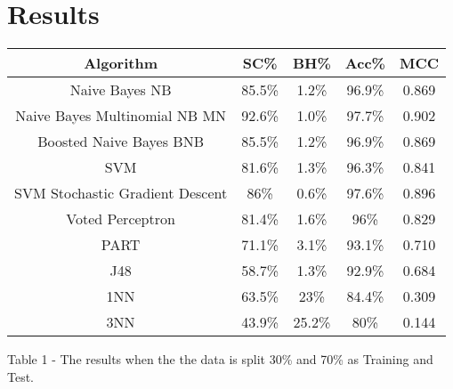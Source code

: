 \chapter{Results}
\label{chap:results}

\vspace{1cm}

\begin{center}
 \begin{tabular}{|c|c|c|c|c|} 
 \hline
 Algorithm & SC\% & BH\% & Acc\%  & MCC \\ [0.5ex] 
 \hline\hline
 Naive Bayes NB & 85.5\% & 1.2\% & 96.9\% & 0.869  \\ 
 \hline
 Naive Bayes Multinomial NB MN & 92.6\% & 1.0\% & 97.7\% & 0.902  \\ 
 \hline
 Boosted Naive Bayes BNB & 85.5\% & 1.2\% & 96.9\% & 0.869  \\ 
 \hline
 SVM & 81.6\% & 1.3\% & 96.3\% & 0.841  \\ 
 \hline
 SVM Stochastic Gradient Descent & 86\% & 0.6\% & 97.6\% & 0.896  \\ 
 \hline
 Voted Perceptron & 81.4\% & 1.6\% & 96\% & 0.829  \\ 
 \hline
 PART & 71.1\% & 3.1\% & 93.1\% & 0.710  \\ 
 \hline
 J48 & 58.7\% & 1.3\% & 92.9\% & 0.684  \\ 
 \hline
 1NN & 63.5\% & 23\% & 84.4\% & 0.309  \\ 
 \hline
 3NN & 43.9\% & 25.2\% & 80\% & 0.144 \\ [1ex] 
 \hline
 \end{tabular}
 
      \small
      \item Table 1 - The results when the the data is split 30\% and 70\% as 
      Training and Test.
    
 
\end{center}

\vspace{1cm}


